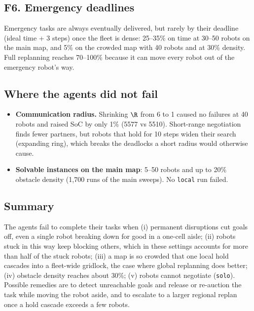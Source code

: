 \subsection*{F6. Emergency deadlines}
Emergency tasks are always eventually delivered, but rarely by their deadline (ideal time
+ 3 steps) once the fleet is dense: 25--35\% on time at 30--50 robots on the main map,
and 5\% on the crowded map with 40 robots and at 30\% density. Full replanning reaches
70--100\% because it can move every robot out of the emergency robot's way.

\subsection*{Where the agents did not fail}
\begin{itemize}
  \item \textbf{Communication radius.} Shrinking $\R$ from 6 to 1 caused no failures at
        40 robots and raised SoC by only 1\% (5577 vs 5510). Short-range negotiation finds
        fewer partners, but robots that hold for 10 steps widen their search (expanding
        ring), which breaks the deadlocks a short radius would otherwise cause.
  \item \textbf{Solvable instances on the main map}: 5--50 robots and up to 20\% obstacle
        density (1{,}700 runs of the main sweeps). No \texttt{local} run failed.
\end{itemize}

\subsection*{Summary}
The agents fail to complete their tasks when
(i) permanent disruptions cut goals off, even a single robot breaking down for good in a
one-cell aisle;
(ii) robots stuck in this way keep blocking others, which in these settings accounts for
more than half of the stuck robots;
(iii) a map is so crowded that one local hold cascades into a fleet-wide gridlock, the
case where global replanning does better;
(iv) obstacle density reaches about 30\%;
(v) robots cannot negotiate (\texttt{solo}).
Possible remedies are to detect unreachable goals and release or re-auction the task while
moving the robot aside, and to escalate to a larger regional replan once a hold cascade
exceeds a few robots.
